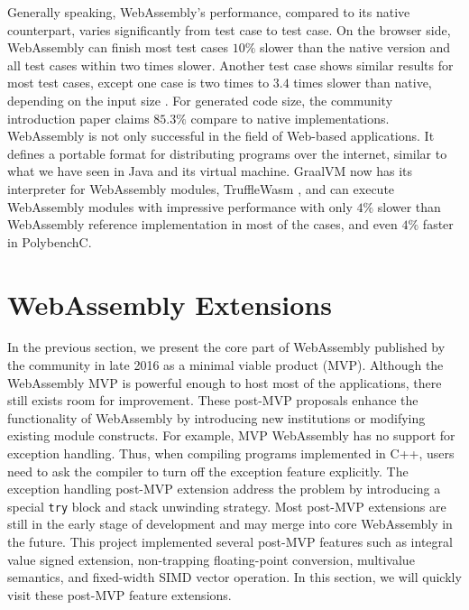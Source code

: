 Generally speaking, WebAssembly's performance, compared to its native counterpart, varies significantly from test case to test case. On the browser side, WebAssembly can finish most test cases $10\%$ slower than the native version and all test cases within two times slower. Another test case shows similar results for most test cases, except one case is two times to $3.4$ times slower than native, depending on the input size \cite{234914}. For generated code size, the community introduction paper claims $85.3\%$ compare to native implementations. WebAssembly is not only successful in the field of Web-based applications. It defines a portable format for distributing programs over the internet, similar to what we have seen in Java and its virtual machine. GraalVM now has its interpreter for WebAssembly modules, TruffleWasm \cite{trufflewasm}, and can execute WebAssembly modules with impressive performance with only $4\%$ slower than WebAssembly reference implementation in most of the cases, and even $4\%$ faster in PolybenchC.

\section{WebAssembly Extensions}

In the previous section, we present the core part of WebAssembly published by the community in late 2016 as a minimal viable product (MVP). Although the WebAssembly MVP is powerful enough to host most of the applications\cite{webassembly-survey}, there still exists room for improvement. These post-MVP proposals enhance the functionality of WebAssembly by introducing new institutions or modifying existing module constructs. For example, MVP WebAssembly has no support for exception handling. Thus, when compiling programs implemented in C++, users need to ask the compiler to turn off the exception feature explicitly. The exception handling post-MVP extension address the problem by introducing a special \texttt{try} block and stack unwinding strategy. Most post-MVP extensions are still in the early stage of development and may merge into core WebAssembly in the future. This project implemented several post-MVP features such as integral value signed extension, non-trapping floating-point conversion, multivalue semantics, and fixed-width SIMD vector operation. In this section, we will quickly visit these post-MVP feature extensions.

